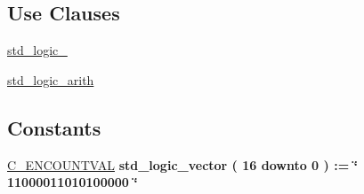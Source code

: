 \subsection*{Use Clauses}
 \begin{DoxyCompactItemize}
\item 
\mbox{\label{classio__ctrl_1_1rtl_acd03516902501cd1c7296a98e22c6fcb}} 
\hyperlink{classio__ctrl_1_1rtl_acd03516902501cd1c7296a98e22c6fcb}{std\+\_\+logic\+\_}   
\item 
\mbox{\label{classio__ctrl_1_1rtl_a0f5ecc6613f63d07f7963a97b1b26095}} 
\hyperlink{classio__ctrl_1_1rtl_a0f5ecc6613f63d07f7963a97b1b26095}{std\+\_\+logic\+\_\+arith}   
\end{DoxyCompactItemize}
\subsection*{Constants}
 \begin{DoxyCompactItemize}
\item 
\mbox{\label{classio__ctrl_1_1rtl_a85d68696ce8aad74f4f3f0f5d6cb860a}} 
\hyperlink{classio__ctrl_1_1rtl_a85d68696ce8aad74f4f3f0f5d6cb860a}{C\+\_\+\+E\+N\+C\+O\+U\+N\+T\+V\+AL} {\bfseries \textcolor{vhdlchar}{std\+\_\+logic\+\_\+vector}\textcolor{vhdlchar}{ }\textcolor{vhdlchar}{(}\textcolor{vhdlchar}{ }\textcolor{vhdlchar}{ } \textcolor{vhdldigit}{16} \textcolor{vhdlchar}{ }\textcolor{vhdlchar}{downto}\textcolor{vhdlchar}{ }\textcolor{vhdlchar}{ } \textcolor{vhdldigit}{0} \textcolor{vhdlchar}{ }\textcolor{vhdlchar}{)}\textcolor{vhdlchar}{ }\textcolor{vhdlchar}{ }\textcolor{vhdlchar}{ }\textcolor{vhdlchar}{\+:}\textcolor{vhdlchar}{=}\textcolor{vhdlchar}{ }\textcolor{vhdlchar}{ }\textcolor{vhdlchar}{ }\textcolor{vhdlchar}{ }\textcolor{keyword}{\char`\"{} 11000011010100000 \char`\"{}}\textcolor{vhdlchar}{ }} 
\end{DoxyCompactItemize}
